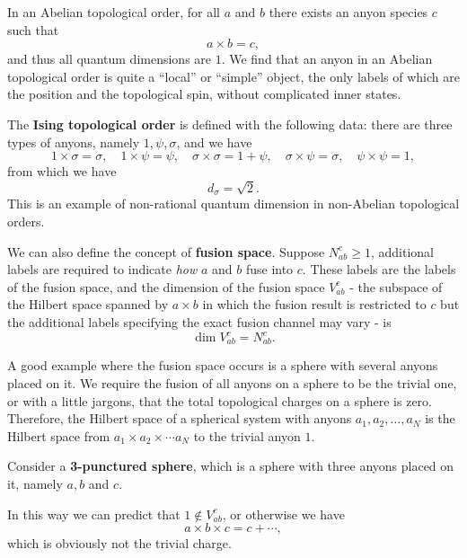 \documentclass[hyperref, a4paper]{article}
\newcommand*{\concept}[1]{{\textbf{#1}}}
\begin{document}
In an Abelian topological order, for all $a$ and $b$ there exists an anyon species $c$ such that 
\begin{equation}
    a \times b = c,
\end{equation}
and thus all quantum dimensions are $1$. 
We find that an anyon in an Abelian topological order is quite a ``local'' or ``simple'' object, the only labels of which are the position and the topological spin, without complicated inner states.

The \concept{Ising topological order} is defined with the following data: there are three types of anyons, namely $1, \psi, \sigma$, and we have 
\begin{equation}
    1 \times \sigma = \sigma, \quad 1 \times \psi = \psi, \quad  \sigma \times \sigma = 1 + \psi, \quad \sigma \times \psi = \sigma, \quad \psi \times \psi = 1,
\end{equation}
from which we have 
\begin{equation}
    d_\sigma = \sqrt{2}.
\end{equation}
This is an example of non-rational quantum dimension in non-Abelian topological orders.

We can also define the concept of \concept{fusion space}. Suppose $N_{ab}^c \geq 1$, additional labels are required to indicate \emph{how} $a$ and $b$ fuse into $c$.
These labels are the labels of the fusion space, and the dimension of the fusion space $V_{ab}^c$ - the subspace of the Hilbert space spanned by $a \times b$ in which the fusion result is restricted to $c$ but the additional labels specifying the exact fusion channel may vary - is 
\begin{equation}
    \dim V_{ab}^c = N_{ab}^c.
\end{equation}

A good example where the fusion space occurs is a sphere with several anyons placed on it.
We require the fusion of all anyons on a sphere to be the trivial one, or with a little jargons, that the total topological charges on a sphere is zero.
Therefore, the Hilbert space of a spherical system with anyons $a_1, a_2, \ldots, a_N$ is the Hilbert space from $a_1 \times a_2 \times \cdots a_N$ to the trivial anyon $1$.

Consider a \concept{3-punctured sphere}, which is a sphere with three anyons placed on it, namely $a, b$ and $c$.

In this way we can predict that $1 \notin V_{ab}^c$, or otherwise we have 
\[
    a \times b \times c = c + \cdots,
\]
which is obviously not the trivial charge.
\end{document}
